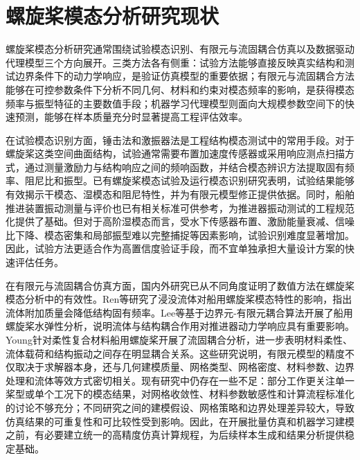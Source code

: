\section{螺旋桨模态分析研究现状}

螺旋桨模态分析研究通常围绕试验模态识别、有限元与流固耦合仿真以及数据驱动代理模型三个方向展开。三类方法各有侧重：试验方法能够直接反映真实结构和测试边界条件下的动力学响应，是验证仿真模型的重要依据；有限元与流固耦合方法能够在可控参数条件下分析不同几何、材料和约束对模态频率的影响，是获得模态频率与振型特征的主要数值手段；机器学习代理模型则面向大规模参数空间下的快速预测，能够在样本质量充分时显著提高工程评估效率。

在试验模态识别方面，锤击法和激振器法是工程结构模态测试中的常用手段。对于螺旋桨这类空间曲面结构，试验通常需要布置加速度传感器或采用响应测点扫描方式，通过测量激励力与结构响应之间的频响函数，并结合模态辨识方法提取固有频率、阻尼比和振型。已有螺旋桨模态试验及运行模态识别研究表明，试验结果能够有效揭示干模态、湿模态和阻尼特性，并为有限元模型修正提供依据\cite{intro:5,intro:18}。同时，船舶推进装置振动测量与评价也已有相关标准可供参考，为推进器振动测试的工程规范化提供了基础\cite{intro:19}。但对于高阶湿模态而言，受水下传感器布置、激励能量衰减、信噪比下降、模态密集和局部振型难以完整捕捉等因素影响，试验识别难度显著增加。因此，试验方法更适合作为高置信度验证手段，而不宜单独承担大量设计方案的快速评估任务。

在有限元与流固耦合仿真方面，国内外研究已从不同角度证明了数值方法在螺旋桨模态分析中的有效性。Ren等研究了浸没流体对船用螺旋桨模态特性的影响，指出流体附加质量会降低结构固有频率\cite{intro:2}。Lee等基于边界元-有限元耦合算法开展了船用螺旋桨水弹性分析，说明流体与结构耦合作用对推进器动力学响应具有重要影响\cite{intro:3}。Young针对柔性复合材料船用螺旋桨开展了流固耦合分析，进一步表明材料柔性、流体载荷和结构振动之间存在明显耦合关系\cite{intro:4}。这些研究说明，有限元模型的精度不仅取决于求解器本身，还与几何建模质量、网格类型、网格密度、材料参数、边界处理和流体等效方式密切相关。现有研究中仍存在一些不足：部分工作更关注单一桨型或单个工况下的模态结果，对网格收敛性、材料参数敏感性和计算流程标准化的讨论不够充分；不同研究之间的建模假设、网格策略和边界处理差异较大，导致仿真结果的可重复性和可比较性受到影响。因此，在开展批量仿真和机器学习建模之前，有必要建立统一的高精度仿真计算规程，为后续样本生成和结果分析提供稳定基础。

